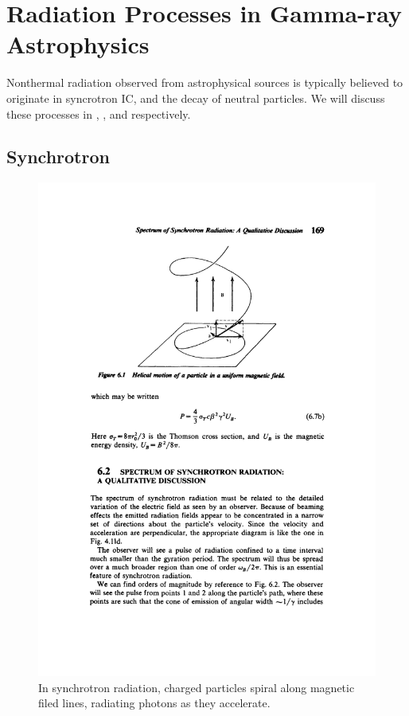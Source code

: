 \section{Radiation Processes in Gamma-ray Astrophysics}

Nonthermal radiation observed from astrophysical sources is
typically believed to originate in syncrotron \ac{IC}, and the
decay of neutral \pion particles.  We will discuss these processes
in , , and
 respectively.

\subsection{Synchrotron}

\begin{figure}[htbp]
  \centering 
    \includegraphics{chapters/introduction/figures/syncrotron_radiation_spiral.pdf}
    \caption{In synchrotron radiation, charged particles spiral along
      magnetic filed lines, radiating photons as they accelerate.}
\end{figure}


